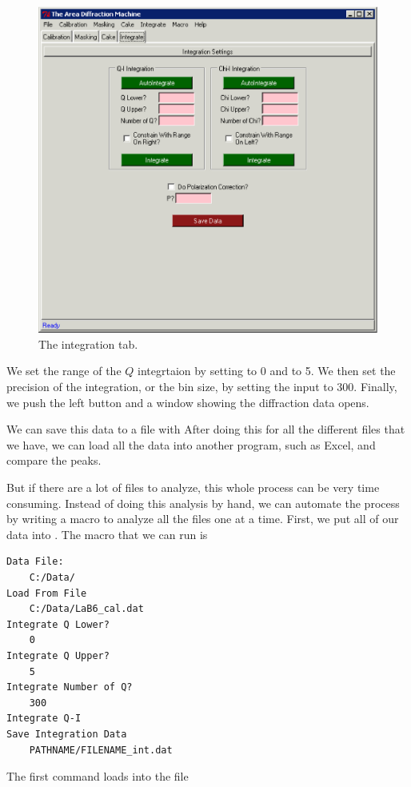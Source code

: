 \begin{figure}[h]
    \centering
    \includegraphics[scale=.75]{figures/integration_page.eps}
    \caption{The integration tab.}
    \label{integration_page}
\end{figure}

We set the range of the $Q$ integrtaion by setting
 to 0 and  to 5. We
then set the precision of the integration, or the
bin size, by setting the  input
to 300. Finally, we push the left 
button and a window showing the diffraction data
opens. 

We can save this data to a file with 
After doing this for all the different files that
we have, we can load all the data into another program,
such as Excel, and compare the peaks.

But if there are a lot of files to analyze, this whole
process can be very time consuming. Instead of doing 
this analysis by hand, we can automate the process by
writing a macro to analyze all the files one at a 
time. First, we put all of our data into .
The macro that we can run is
\begin{lstlisting}[caption={'A macro to automate the 
    analysis'}]
Data File:
	C:/Data/
Load From File
    C:/Data/LaB6_cal.dat
Integrate Q Lower?
	0
Integrate Q Upper?
	5
Integrate Number of Q?
	300
Integrate Q-I
Save Integration Data
    PATHNAME/FILENAME_int.dat
\end{lstlisting}
The first command loads into the file

